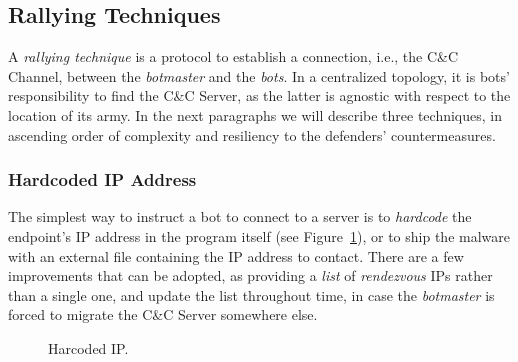 

\subsection{Rallying Techniques} %
\label{sub:communication_systems}
A \emph{rallying technique} is a protocol to establish a connection, i.e., the C\&C
Channel, between the \emph{botmaster} and the \emph{bots}. In a centralized topology,
it is bots' responsibility to find the C\&C Server, as the latter is agnostic
with respect to the location of its army. In the next paragraphs we will describe three
techniques, in ascending order of complexity and resiliency to the defenders'
countermeasures.

\subsubsection{Hardcoded IP Address} %
\label{ssub:hardcoded_ip_address}
The simplest way to instruct a bot to connect to a server is to \emph{hardcode}
the endpoint's IP address in the program itself (see Figure~\ref{fig:hardcoded_ip}),
or to ship the malware with an external
file containing the IP address to contact. There are a few improvements that can
be adopted, as providing a \emph{list} of \emph{rendezvous} IPs rather than a single
one, and update the list throughout time, in case the \emph{botmaster} is forced
to migrate the C\&C Server somewhere else.

\begin{figure}[!htp]
\centering
{}
\caption{Harcoded IP.}
\label{fig:hardcoded_ip}
\end{figure}

